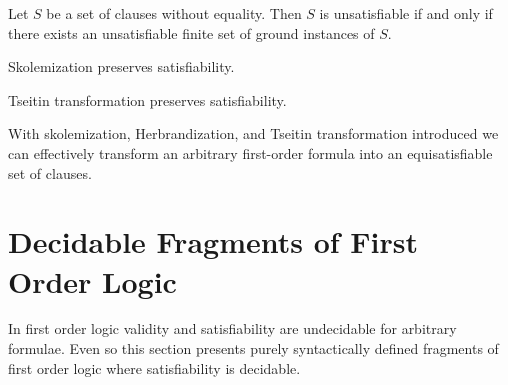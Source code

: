 \begin{corollary}
	Let \( S \) be a set of clauses without equality.
	Then \( S \) is unsatisfiable if and only if there exists
	an unsatisfiable finite set of ground instances of \( S \).
\end{corollary}

\begin{lemma}
	Skolemization preserves satisfiability.
\end{lemma}

\begin{lemma}
	Tseitin transformation preserves satisfiability.
\end{lemma}


\begin{lemma}
With skolemization, Herbrandization, and Tseitin transformation introduced 
we can effectively transform an arbitrary first-order formula 
into an equisatisfiable set of clauses.
\end{lemma}


\section{Decidable Fragments of First Order Logic}\label{sec:decidable:fol:fragments}

In first order logic validity and satisfiability are undecidable for arbitrary formulae.
Even so this section presents purely syntactically defined fragments
of first order logic where satisfiability is decidable.%

